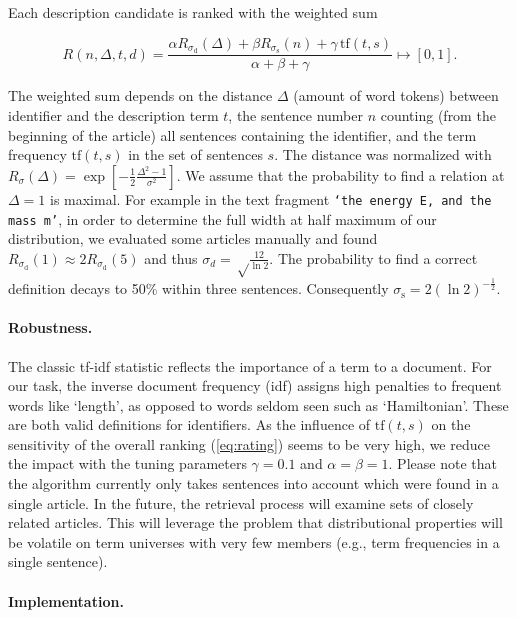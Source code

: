 \documentclass[runningheads]{llncs}
\begin{document}
Each description candidate is ranked with the weighted sum

\begin{equation} \label{eq:rating}
R(n,\Delta,t,d)=\frac{\alpha{R}_{\sigma_\mathrm d}(\Delta)
+\beta{R}_{\sigma_\mathrm s}(n)
+\gamma\,\mathrm{tf}(t,s)}{\alpha+\beta+\gamma} \mapsto [0,1].
\end{equation}

The weighted sum depends on the distance $\Delta$ (amount of word tokens) between
identifier and the description term $t$, the sentence number $n$ counting
(from the beginning of the article) all sentences containing the identifier,
and the term frequency $\mathrm{tf}(t,s)$ in the set of sentences $s$. The
distance was normalized with $R_\sigma(\Delta) = \exp\left[ -\frac{1}{2}
\frac{\Delta^2-1}{\sigma^2}\right].$ We assume that the probability to find a
relation at $\Delta=1$ is maximal. For example in the text fragment
\texttt{`the energy E, and the mass m'}, in order to determine the full width
at half maximum of our distribution, we evaluated some articles manually and
found $R_{\sigma_\mathrm d}(1)\approx 2 R_{\sigma_\mathrm d}(5)$ and thus
$\sigma_d=\sqrt\frac{12}{\ln 2}$. The probability to find a correct definition
decays to 50\% within three sentences. Consequently $\sigma_\mathrm
s=2\left({\ln 2}\right)^{-\frac{1}{2}}$.


\paragraph{Robustness.}

The classic tf-idf \cite{Salton86} statistic reflects the importance of a term
to a document. For our task, the inverse document frequency (idf) assigns
high penalties to frequent words like `length', as opposed to words seldom
seen such as `Hamiltonian'. These are both valid definitions for identifiers. 
As the influence of $\mathrm{tf}(t,s)$ on the sensitivity of the overall ranking
(\ref{eq:rating}) seems to be very high, we reduce the impact with the tuning
parameters $\gamma=0.1$ and $\alpha = \beta = 1$. Please note that the algorithm 
currently only takes sentences into account which were found in a single article. 
In the future, the retrieval process will examine sets of closely related articles.
This will leverage the problem that distributional properties will be volatile on 
term universes with very few members (e.g., term frequencies in a single sentence).


\paragraph{Implementation.}
\end{document}
